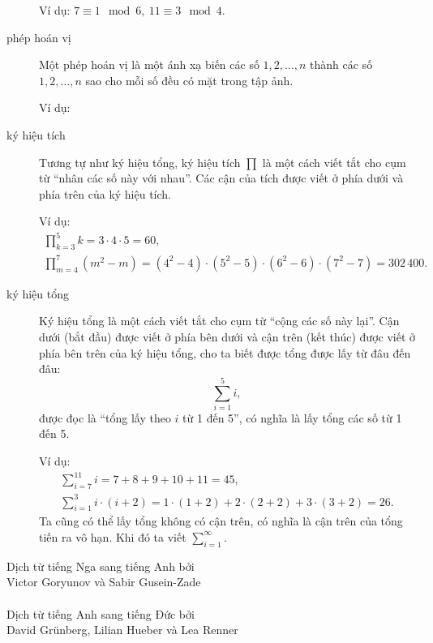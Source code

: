 \begin{description}
		Ví dụ: $7\equiv 1 \mod 6,\ 11\equiv 3\mod 4$. 

	\item[phép hoán vị] Một phép hoán vị là một ánh xạ biến các số $1,2,\dotsc,n$ thành các số $1,2,\dotsc,n$ sao cho mỗi số đều có mặt trong tập ảnh. 

		Ví dụ:
		\begin{figure} 
			\def\svgwidth{200pt} 
			 
		\end{figure} 
	
	\item[ký hiệu tích] Tương tự như ký hiệu tổng, ký hiệu tích $\prod$ là một cách viết tắt cho cụm từ \enquote{nhân các số này với nhau}. Các cận của tích được viết ở phía dưới và phía trên của ký hiệu tích.

		Ví dụ: 
		\begin{gather*}
			\prod\limits_{k=3}^5 k = 3\cdot 4\cdot 5 = 60,\\
			\prod\limits_{m=4}^7 (m^2 - m) = (4^2-4)\cdot(5^2-5)\cdot (6^2-6) \cdot (7^2-7)= 302\,400.
		\end{gather*}
	\item[ký hiệu tổng] Ký hiệu tổng là một cách viết tắt cho cụm từ \enquote{cộng các số này lại}. Cận dưới (bắt đầu) được viết ở phía bên dưới và cận trên (kết thúc) được viết ở phía bên trên của ký hiệu tổng, cho ta biết được tổng được lấy từ đâu đến đâu:		
		\begin{equation*}
			\sum\limits_{i=1}^5 i,
		\end{equation*}
		được đọc là \enquote{tổng lấy theo $i$ từ 1 đến 5}, có nghĩa là lấy tổng các số từ 1 đến 5. 

		Ví dụ:
		\begin{gather*}
			\sum\limits_{i=7}^{11} i= 7+8+9+10+11 = 45,\\
			\sum\limits_{i=1}^3 i\cdot (i+2) = 1\cdot (1+2) + 2\cdot (2+2) + 3\cdot (3+2) = 26.
		\end{gather*}
		Ta cũng có thể lấy tổng không có cận trên, có nghĩa là cận trên của tổng tiến ra vô hạn. Khi đó ta viết $\sum\limits_{i=1}^\infty$. 
\end{description}
\clearpage
\null\vfill
\noindent
Dịch từ tiếng Nga sang tiếng Anh bởi \\
\null\quad Victor Goryunov và Sabir Gusein-Zade\\
\\
Dịch từ tiếng Anh sang tiếng Đức bởi \\
\null\quad David Grünberg, Lilian Hueber và Lea Renner\\
